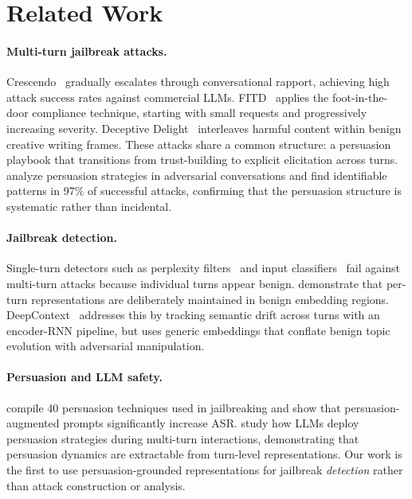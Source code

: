 \documentclass[11pt,a4paper]{article}
\begin{document}
\section{Related Work}

\paragraph{Multi-turn jailbreak attacks.}
Crescendo~\citep{russinovich2024greatnow} gradually escalates through conversational rapport, achieving high attack success rates against commercial LLMs. FITD~\citep{zhou2024speak} applies the foot-in-the-door compliance technique, starting with small requests and progressively increasing severity. Deceptive Delight~\citep{jiang2024deceptive} interleaves harmful content within benign creative writing frames. These attacks share a common structure: a persuasion playbook that transitions from trust-building to explicit elicitation across turns. \citet{hagendorff2026nature} analyze persuasion strategies in adversarial conversations and find identifiable patterns in 97\% of successful attacks, confirming that the persuasion structure is systematic rather than incidental.

\paragraph{Jailbreak detection.}
Single-turn detectors such as perplexity filters~\citep{alon2023detecting} and input classifiers~\citep{inan2023llama} fail against multi-turn attacks because individual turns appear benign. \citet{bullwinkel2025multiturn} demonstrate that per-turn representations are deliberately maintained in benign embedding regions. DeepContext~\citep{su2026deepcontext} addresses this by tracking semantic drift across turns with an encoder-RNN pipeline, but uses generic embeddings that conflate benign topic evolution with adversarial manipulation.

\paragraph{Persuasion and LLM safety.}
\citet{zeng2024persuasion} compile 40 persuasion techniques used in jailbreaking and show that persuasion-augmented prompts significantly increase ASR. \citet{chen2025persuade} study how LLMs deploy persuasion strategies during multi-turn interactions, demonstrating that persuasion dynamics are extractable from turn-level representations. Our work is the first to use persuasion-grounded representations for jailbreak \emph{detection} rather than attack construction or analysis.
\end{document}
